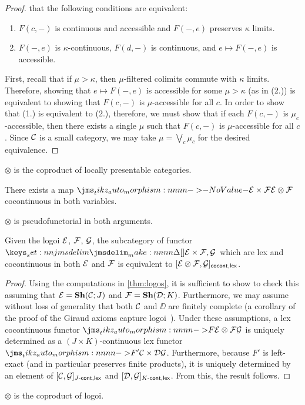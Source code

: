 \documentclass[reqno]{amsart}
\begin{document}
\begin{proof}
  that the following conditions are equivalent:
  \begin{enumerate}
  \item $F(c,-)$ is continuous and accessible and $F(-,e)$ preserves $\kappa$ limits.
  \item $F(-,e)$ is $\kappa$-continuous, $F(d,-)$ is continuous, and $e \mapsto F(-,e)$ is
    accessible.
  \end{enumerate}
  First, recall that if $\mu > \kappa$, then $\mu$-filtered colimits commute with $\kappa$
  limits. Therefore, showing that $e \mapsto F(-,e)$ is accessible for some $\mu > \kappa$ (as in
  (2.)) is equivalent to showing that $F(c,-)$ is $\mu$-accessible for all $c$. In order to show
  that (1.) is equivalent to (2.), therefore, we must show that if each $F(c,-)$ is
  $\mu_c$-accessible, then there exists a single $\mu$ such that $F(c,-)$ is $\mu$-accessible for
  all $c$. Since $\mathcal{C}$ is a small category, we may take $\mu = \bigvee_{c} \mu_c$ for the desired
  equivalence.
\end{proof}
\begin{corollary}
  $\otimes$ is the coproduct of locally presentable categories.
\end{corollary}
\begin{corollary}
  There exists a map $\Mor{\EE \times \FF}{\EE \otimes \FF}$ cocontinuous in both variables.
\end{corollary}
\begin{corollary}
  $\otimes$ is pseudofunctorial in both arguments.
\end{corollary}

\begin{theorem}
  \label{thm:logos-functorial}
  Given the logoi $\mathcal{E}$, $\mathcal{F}$, $\mathcal{G}$, the subcategory of functor $\Hom{\EE \times \FF}{\GG}$ which
  are lex and cocontinuous in both $\mathcal{E}$ and $\mathcal{F}$ is equivalent to
  $\CoCont{\EE \otimes \FF}{\GG}{lex}$.
\end{theorem}
\begin{proof}
  Using the computations in \cref{thm:logos}, it is sufficient to show to check this assuming that
  $\EE = \SH{\CC}[J]$ and $\FF = \SH{\DD}[K]$. Furthermore, we may assume without loss of generality
  that both $\mathcal{C}$ and $\DD$ are finitely complete (a corollary of the proof of the Giraud axioms
  capture logoi~\parencite{maclane-moerdijk:1992}). Under these assumptions, a lex cocontinuous functor
  $\Mor[F]{\EE \otimes \FF}{\GG}$ is uniquely determined as a $(J \times K)$-continuous lex functor
  $\Mor[F']{\CC \times \DD}{\GG}$. Furthermore, because $F'$ is left-exact (and in particular
  preserves finite products), it is uniquely determined by an element of
  $\Cont[J]{\CC}{\GG}{lex}$ and $\Cont[K]{\DD}{\GG}{lex}$. From this, the result follows.
\end{proof}
\begin{corollary}
  $\otimes$ is the coproduct of logoi.
\end{corollary}

\printbibliography
\end{document}
